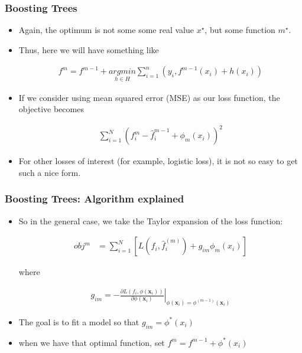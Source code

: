 \documentclass[
  shownotes,
  xcolor={svgnames},
  hyperref={colorlinks,citecolor=DarkBlue,linkcolor=DarkRed,urlcolor=DarkBlue}
  , aspectratio=169]{beamer}
\begin{document}
\begin{frame}[fragile]
\frametitle{Boosting Trees}

\begin{itemize}


\item Again, the optimum is not some some real value $x^\star$, but some function $m^\star$. 
\item Thus, here we will have something like

\begin{align}
f^{m}=f^{m-1}+\underset{h\in H}{argmin}\sum_{i=1}^n(y_i,f^{m-1}(x_i)+h(x_i))
\end{align}

\item If we consider using mean squared error (MSE) as our loss function, the objective becomes

\begin{align}
\sum_{i=1}^N (f^m_i-\hat{f}_i^{m-1} + \phi_m(x_i))^2
\end{align}

\item  For other losses of interest (for example, logistic loss), it is not so easy to get such a nice form.
\end{itemize}
 \end{frame}
\begin{frame}[fragile]
\frametitle{Boosting Trees: Algorithm explained}

\begin{itemize}
\item  So in the general case, we take the Taylor expansion of the loss function:

\begin{align}
obj^m &= \sum_{i=1}^N \left[ L(f_i,\hat{f}_i^{(m)}) + g_{im} \phi_m(x_i) \right]
\end{align}

where 

\begin{align}
        g_{im}=-\left.\frac{\partial L(f_i,\phi(\mathbf{x}_i))}{\partial \phi(\mathbf{x}_i)}\right\vert_{\phi(\mathbf{x}_i)=\phi^{(m-1)}(\mathbf{x}_i)}
  \end{align}

\item The goal is to fit a model so that $g_{im}=\phi^*(x_i)$
\item when we have that optimal function, set $f^{m}=f^{m-1}+\phi^*(x_i)$
\end{itemize}
 \end{frame}
\end{document}
